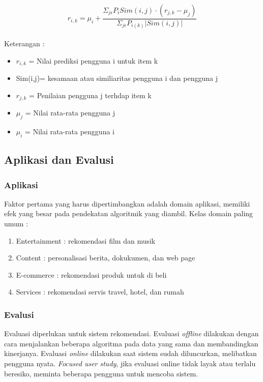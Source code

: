 \begin{enumerate}
	\begin{equation}
		r_{i,k} = \mu_{i} + \frac{\Sigma _{j \epsilon} P_{i} Sim(i,j)\cdot (r_{j,k} - \mu_{j})}{\Sigma _{j \epsilon} P_{i(k)} |Sim(i,j)|}
	\end{equation}\leavevmode \\
	
	Keterangan :
	\begin{itemize}
		\item $r_{i,k}$ = Nilai prediksi pengguna i untuk item k
		
		\item Sim(i,j)= kesamaan atau similiaritas pengguna i dan pengguna j
		
		\item $r_{j,k}$ = Penilaian pengguna j terhdap item k
		
		\item $\mu_{j}$ = Nilai rata-rata pengguna j
		
		\item $\mu_{i}$ = Nilai rata-rata pengguna i
	\end{itemize}\leavevmode
	 
\end{enumerate}\leavevmode



\subsection{Aplikasi dan Evalusi}
\label{sec:aplikasi dan evaluasi}
\subsubsection{Aplikasi}
Faktor pertama yang harus dipertimbangkan adalah domain aplikasi, memiliki efek yang besar pada pendekatan algoritmik yang diambil. Kelas domain paling umum : %
\begin{enumerate}
	\item Entertainment : rekomendasi film dan musik
	\item Content : personalisasi berita, dokukumen, dan web page
	\item E-commerce : rekomendasi produk untuk di beli
	\item Services : rekomendasi servis travel, hotel, dan rumah
\end{enumerate}

\subsubsection{Evalusi}
Evaluasi diperlukan untuk sistem rekomendasi. Evaluasi \textit{offline} dilakukan dengan cara menjalankan beberapa algoritma pada data yang sama dan membandingkan kinerjanya. Evaluasi \textit{online} dilakukan saat sistem sudah diluncurkan, melibatkan pengguna nyata. \textit{Focused user study}, jika
evaluasi online tidak layak atau terlalu beresiko, meminta beberapa pengguna untuk mencoba
sistem.

